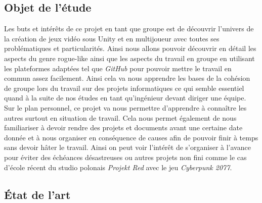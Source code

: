 \documentclass{article}
\begin{document}
\subsection{Objet de l'étude}

Les buts et intérêts de ce projet en tant que groupe est de découvrir l'univers de la création de jeux vidéo sous Unity et en multijoueur avec toutes ses problématiques et particularités. Ainsi nous allons pouvoir découvrir en détail les aspects du genre rogue-like ainsi que les aspects du travail en groupe en utilisant les plateformes adaptées tel que \textit{GitHub} pour pouvoir mettre le travail en commun assez facilement. Ainsi cela va nous apprendre les bases de la cohésion de groupe lors du travail sur des projets informatiques ce qui semble essentiel quand à la suite de nos études en tant qu'ingénieur devant diriger une équipe.\\
Sur le plan personnel, ce projet va nous permettre d'apprendre à connaître les autres surtout en situation de travail. Cela nous permet également de nous familiariser à devoir rendre des projets et documents avant une certaine date donnée et à nous organiser en conséquence de causes afin de pouvoir finir à temps sans devoir hâter le travail. Ainsi on peut voir l'intérêt de s'organiser à l'avance pour éviter des échéances désastreuses ou autres projets non fini comme le cas d'école récent du studio polonais \textit{Projekt Red} avec le jeu \textit{Cyberpunk 2077}.

\subsection{État de l'art}
\end{document}
